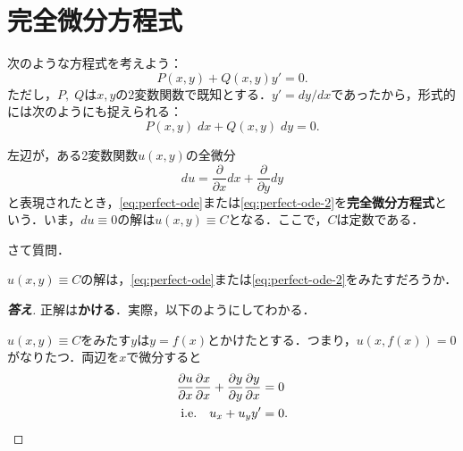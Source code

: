 \section{完全微分方程式} %
次のような方程式を考えよう：
\begin{equation}
    P(x,y) + Q(x,y)y' = 0. \label{eq:perfect-ode}
\end{equation}
ただし，$P,\;Q$は$x,y$の2変数関数で既知とする．$y'=dy/dx$であったから，形式的には次のようにも捉えられる：
\begin{equation}
    P(x,y) \; dx + Q(x,y) \; dy = 0. \label{eq:perfect-ode-2}
\end{equation}

左辺が，ある2変数関数$u(x,y)$の全微分
\[ du = \frac{\partial }{\partial x}dx + \frac{\partial }{\partial y}dy \]
と表現されたとき，\eqref{eq:perfect-ode}または\eqref{eq:perfect-ode-2}を\textbf{完全微分方程式}という．いま，$du \equiv 0$の解は$u(x,y) \equiv C$となる．ここで，$C$は定数である．

さて質問．
\begin{question*}
    $u(x,y) \equiv C$の解は，\eqref{eq:perfect-ode}または\eqref{eq:perfect-ode-2}をみたすだろうか．
\end{question*}
\begin{proof}[\textbf{答え}]
    正解は\textbf{かける}．実際，以下のようにしてわかる．

    $u(x,y) \equiv C$をみたす$y$は$y=f(x)$とかけたとする．つまり，$u(x,f(x))=0$がなりたつ．両辺を$x$で微分すると
    \begin{align*}
        \frac{\partial u}{\partial x} \frac{\partial x}{\partial x} + \frac{\partial y}{\partial y} \frac{\partial y}{\partial x} &= 0 \\
        \text{i.e.} \quad u_x + u_y y' &= 0.
    \end{align*}
\end{proof}


